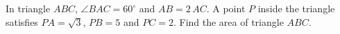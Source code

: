 In triangle $ABC$, $\angle BAC=60^\circ$ and $AB=2\,AC$. A point $P$ inside the triangle satisfies $PA=\sqrt3$, $PB=5$ and $PC=2$. Find the area of triangle $ABC$.
